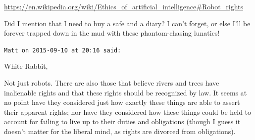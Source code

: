\begin{footnotesize}
\begin{sffamily}
\url{https://en.wikipedia.org/wiki/Ethics\_of\_artificial\_intelligence\#Robot\_rights}


Did I mention that I need to buy a safe and a diary? I can't forget, or else I'll be forever trapped down in the mud with these phantom-chasing lunatics!

\hfill

\texttt{Matt on 2015-09-10 at 20:16 said:}

White Rabbit,

Not just robots. There are also those that believe rivers and trees have inalienable rights and that these rights should be recognized by law. It seems at no point have they considered just how exactly these things are able to assert their apparent rights; nor have they considered how these things could be held to account for failing to live up to their duties and obligations (though I guess it doesn't matter for the liberal mind, as rights are divorced from obligations).


\hfill

\end{sffamily}
\end{footnotesize}

